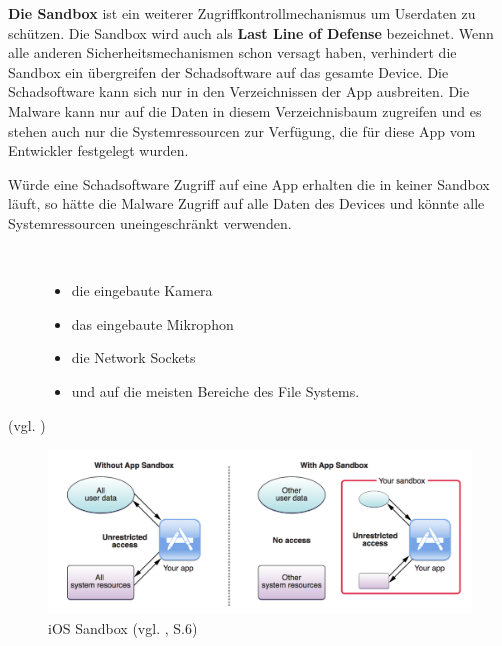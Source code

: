 \textbf{Die Sandbox} ist ein weiterer Zugriffkontrollmechanismus um Userdaten zu schützen. Die Sandbox wird auch als \textbf{Last Line of Defense} bezeichnet. Wenn alle anderen Sicherheitsmechanismen schon versagt haben, verhindert die Sandbox ein übergreifen der Schadsoftware auf das gesamte Device. Die Schadsoftware kann sich nur in den Verzeichnissen der App ausbreiten. Die Malware kann nur auf die Daten in diesem Verzeichnisbaum zugreifen und es stehen auch nur die Systemressourcen zur Verfügung, die für diese App vom Entwickler festgelegt wurden. \par
Würde eine Schadsoftware Zugriff auf eine App erhalten die in keiner Sandbox läuft, so hätte die Malware Zugriff auf alle Daten des Devices und könnte alle Systemressourcen uneingeschränkt verwenden.

\begin{description}
    \item[\parbox{\textwidth} {Unteranderem könnte die Malware folgende Systemressourcen unbemerkt vom User verwenden}]~\par
    \begin{itemize}
        \item die eingebaute Kamera
        \item das eingebaute Mikrophon
        \item die Network Sockets
        \item und auf die meisten Bereiche des File Systems.
    \end{itemize}
\end{description} 
(vgl. \cite{Apple[6], Sandbox[1], Sandbox[2],Sandbox[3], Sandbox[4], Sandbox[5]})

\begin{figure}[!ht]
        \centering
                \includegraphics[scale=0.6]{iOSsandbox}
        \caption{iOS Sandbox (vgl. \cite{Sandbox[3]}, S.6)}
        \label{fig:iOSsandbox}
\end{figure}


